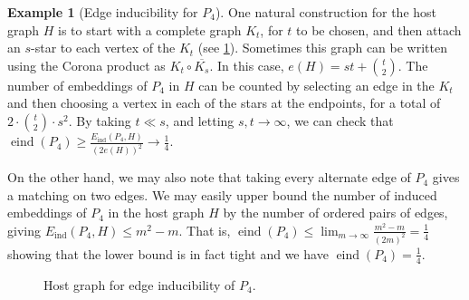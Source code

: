 \documentclass[reqno,11pt]{amsart}
\numberwithin{equation}{section}
\theoremstyle{definition}
\newtheorem{example}[theorem]{Example}
\theoremstyle{remark}
\newcommand{\ang}[1]{\left\langle #1 \right\rangle}
\DeclareMathOperator{\ind}{ind}
\DeclareMathOperator{\eind}{eind}
\begin{document}
\begin{example}[Edge inducibility for $P_4$]\label{ex:P4}
    One natural construction for the host graph $H$ is to start with a complete graph $K_t$, for $t$ to be chosen, and then attach an $s$-star to each vertex of the $K_t$ (see \cref{fig:P4-host}). Sometimes this graph can be written using the Corona product \cite{FH70} as $K_t \circ \overline{K_s}$.
    In this case, $e(H) = st + \binom{t}{2}$. The number of embeddings of $P_4$ in $H$ can be counted by selecting an edge in the $K_t$ and then choosing a vertex in each of the stars at the endpoints, for a total of $2 \cdot \binom{t}{2} \cdot s^2$. By taking $t \ll s$, and letting $s,t \to \infty$, we can check that $\eind(P_4)\geq \frac{E_{\ind}(P_4,H)}{(2e(H))^2} \to \frac{1}{4}$. 
    
    On the other hand, we may also note that taking every alternate edge of $P_4$ gives a matching on two edges. We may easily upper bound the number of induced embeddings of $P_4$ in the host graph $H$ by the number of ordered pairs of edges, giving $E_{\ind}(P_4,H) \leq m^2-m$. That is, $\eind(P_4) \leq \lim_{m \to \infty} \frac{m^2 - m}{(2m)^2} = \frac{1}{4}$ showing that the lower bound is in fact tight and we have $\eind(P_4) = \frac{1}{4}$.

    \begin{figure}[!htp] 
\caption{Host graph for edge inducibility of $P_4$.}
\label{fig:P4-host}
\end{figure}
\end{example}
\end{document}
